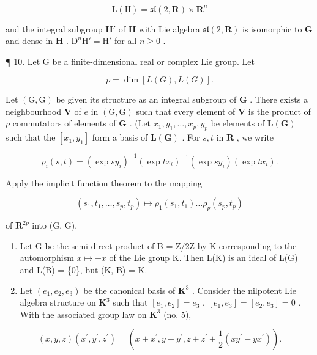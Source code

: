 \[
\mathrm{L} (\mathrm{H}) = \mathfrak {s l} (2, \mathbf {R}) \times \mathbf {R} ^ {n}
\]

and the integral subgroup \(\mathbf{H}'\) of \(\mathbf{H}\) with Lie algebra \(\mathfrak{sl}(2,\mathbf{R})\) is isomorphic to \(\mathbf{G}\) and dense in \(\mathbf{H}\) . \(\mathrm{D}^n\mathrm{H}' = \mathrm{H}'\) for all \(n\geqslant 0\) .

¶ 10. Let G be a finite-dimensional real or complex Lie group. Let

\[
p = \dim [ L (G), L (G) ].
\]

Let \((\mathrm{G},\mathrm{G})\) be given its structure as an integral subgroup of \(\mathbf{G}\) . There exists a neighbourhood \(\mathbf{V}\) of \(e\) in \((\mathrm{G},\mathrm{G})\) such that every element of \(\mathbf{V}\) is the product of \(p\) commutators of elements of \(\mathbf{G}\) . (Let \(x_{1},y_{1},\ldots ,x_{p},y_{p}\) be elements of \(\mathbf{L}(\mathbf{G})\) such that the \([x_1,y_1]\) form a basis of \(\mathbf{L}(\mathbf{G})\) . For \(s,t\) in \(\mathbf{R}\) , we write

\[
\rho_ {i} (s, t) = (\exp s y _ {i}) ^ {- 1} (\exp t x _ {i}) ^ {- 1} (\exp s y _ {i}) (\exp t x _ {i}).
\]

Apply the implicit function theorem to the mapping

\[
\left(s _ {1}, t _ {1}, \dots , s _ {p}, t _ {p}\right) \mapsto \rho_ {1} \left(s _ {1}, t _ {1}\right) \dots \rho_ {p} \left(s _ {p}, t _ {p}\right)
\]

of \(\mathbf{R}^{2p}\) into (G, G).

\begin{enumerate}
\def\labelenumi{\arabic{enumi}.}
\setcounter{enumi}{10}
\item
  Let G be the semi-direct product of B = Z/2Z by K corresponding to the automorphism \(x \mapsto -x\) of the Lie group K. Then L(K) is an ideal of L(G) and L(B) = \{0\}, but (K, B) = K.
\item
  Let \((e_1, e_2, e_3)\) be the canonical basis of \(\mathbf{K}^3\) . Consider the nilpotent Lie algebra structure on \(\mathbf{K}^3\) such that \([e_1, e_2] = e_3\) , \([e_1, e_3] = [e_2, e_3] = 0\) . With the associated group law on \(\mathbf{K}^3\) (no. 5),
\end{enumerate}

\[
(x, y, z) (x ^ {\prime}, y ^ {\prime}, z ^ {\prime}) = (x + x ^ {\prime}, y + y ^ {\prime}, z + z ^ {\prime} + \frac {1}{2} (x y ^ {\prime} - y x ^ {\prime})).
\]

